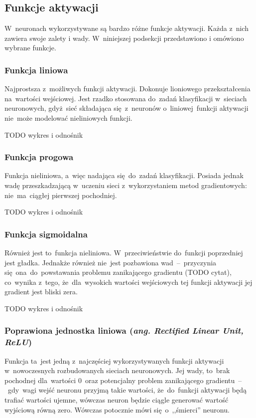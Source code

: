 \subsection{Funkcje aktywacji}
W~neuronach wykorzystywane są bardzo różne funkcje aktywacji. Każda z~nich zawiera swoje zalety i wady. W~niniejszej
podsekcji przedstawiono i omówiono wybrane funkcje.

\subsubsection{Funkcja liniowa}
Najprostsza z~możliwych funkcji aktywacji. Dokonuje lioniowego przekształcenia na~wartości wejściowej. Jest rzadko
stosowana do~zadań klasyfikacji w~sieciach neuronowych, gdyż~sieć składająca się~z~neuronów o~liniowej~funkcji
aktywacji nie~może modelować nieliniowych funkcji.

TODO wykres i odnośnik

\subsubsection{Funkcja progowa}
Funkcja nieliniowa, a~więc nadająca się~do~zadań klasyfikacji. Posiada jednak wadę przeszkadzającą w~uczeniu sieci
z~wykorzystaniem metod gradientowych: nie~ma~ciągłej pierwszej pochodniej.

TODO wykres i odnośnik

\subsubsection{Funkcja sigmoidalna}
Również jest to~funkcja nieliniowa. W~przeciwieństwie do~funkcji poprzedniej jest gładka. Jednakże również nie~jest
pozbawiona wad~--~przyczynia się~ona~do~powstawania problemu zanikającego gradientu (TODO cytat), co~wynika z~tego,
że~dla~wysokich wartości wejściowych tej funkcji aktywacji jej gradient jest bliski zera.

TODO wykres i odnośnik

\subsubsection{Poprawiona jednostka liniowa (\textit{ang. Rectified Linear Unit, ReLU})}
Funkcja ta~jest jedną z~najczęściej wykorzystywanych funkcji aktywacji w~nowoczesnych rozbudowanych sieciach
neuronowych. Jej wady, to~brak pochodnej dla~wartości 0~oraz potencjalny problem zanikającego gradientu~--~gdy~wagi
wejść neuronu przyjmą takie wartości, że~do~funkcji aktywacji będą trafiać wartości ujemne, wówczas neuron
będzie ciągle generować wartość wyjściową równą zero. Wówczas potocznie mówi się~o~,,śmierci'' neuronu.

